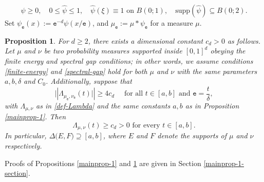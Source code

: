 \documentclass[a4paper,11pt]{amsart}
\newtheorem{prop}[thm]{\bf Proposition}
\numberwithin{equation}{section}
\begin{document}
\begin{equation} 
\psi \geq 0, \quad 0 \leq \widehat{\psi} \leq 1, \quad \widehat{\psi}(\xi) \equiv 1 \text{ on } B(0;1), \quad \text{supp}(\widehat{\psi}) \subseteq B(0;2). \label{psi-conditions} 
\end{equation}  
Set $\psi_{\mathtt e}(x) := \mathtt e^{-d} \psi(x/\mathtt e)$, and $\mu_{\mathtt e} := \mu \ast \psi_{\mathtt e}$ for a measure $\mu$. 
\begin{prop}\label{mainprop-1'} 
For $d \geq 2$, there exists a dimensional constant $c_d > 0$ as follows.  
\vskip0.1in 
\noindent Let $\mu$ and $\nu$ be two probability measures supported inside $[0,1]^d$ obeying the finite energy and spectral gap conditions; in other words, we assume conditions \eqref{finite-energy} and \eqref{spectral-gap} hold for both $\mu$ and $\nu$ with the same parameters $a, b, \delta$ and $C_0$. Additionally, suppose that 
\begin{equation} 
\bigl|| \Lambda_{\mu_{\mathtt e}, \nu_{\mathtt e}}(t) \bigr|| \geq 4c_d \quad \text{ for all } t \in [a, b] \text{ and } \mathtt e = \frac{t}{\delta},  \label{third-condition-mu-nu}
\end{equation} 
with $\Lambda_{\mu, \nu}$ as in \eqref{def-Lambda} and the same constants $a, b$ as in Proposition \ref{mainprop-1}. Then 
\begin{equation} \label{mainprop-1'-conclusion} \Lambda_{\mu, \nu}(t) \geq c_d > 0 \text{ for every } t \in [a, b]. 
\end{equation}    In particular, $\Delta \bigl(E, F\bigr) \supseteq [a, b]$, where $E$ and $F$ denote the supports of $\mu$ and $\nu$ respectively.    
\end{prop}
\noindent  Proofs of Propositions \ref{mainprop-1} and \ref{mainprop-1'} are given in Section \ref{mainprop-1-section}. 
\end{document}
